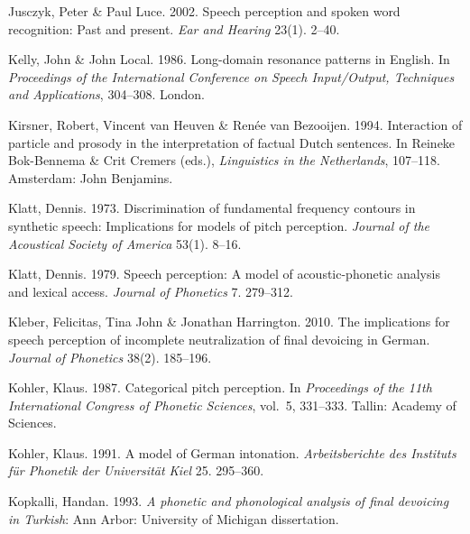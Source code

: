 \documentclass[ number=1
,series=labphon
,output=long
,url=http://langsci-press.org/catalog/book/16
,isbn=978-3-944675-01-5
]{LSP/langsci}
\begin{document}
\begin{thebibliography}{284}
Jusczyk, Peter \& Paul Luce. 2002.
\newblock Speech perception and spoken word recognition: {P}ast and present.
\newblock \emph{Ear and Hearing} 23(1). 2--40.

\enlargethispage{\baselineskip}
Kelly, John \& John Local. 1986.
\newblock Long-domain resonance patterns in {E}nglish.
\newblock In \emph{Proceedings of the {International Conference on Speech
  Input/Output, Techniques and Applications}}, 304--308. London.

Kirsner, Robert, Vincent {van Heuven} \& Renée {van Bezooijen}. 1994.
\newblock Interaction of particle and prosody in the interpretation of factual
  {D}utch sentences.
\newblock In Reineke Bok-Bennema \& Crit Cremers (eds.), \emph{Linguistics in
  the {N}etherlands}, 107--118. Amsterdam: John Benjamins.

Klatt, Dennis. 1973.
\newblock Discrimination of fundamental frequency contours in synthetic speech:
  {I}mplications for models of pitch perception.
\newblock \emph{Journal of the Acoustical Society of America} 53(1). 8--16.

Klatt, Dennis. 1979.
\newblock Speech perception: {A} model of acoustic-phonetic analysis and
  lexical access.
\newblock \emph{Journal of Phonetics} 7. 279--312.

Kleber, Felicitas, Tina John \& Jonathan Harrington. 2010.
\newblock The implications for speech perception of incomplete neutralization
  of final devoicing in {G}erman.
\newblock \emph{Journal of Phonetics} 38(2). 185--196.

Kohler, Klaus. 1987.
\newblock Categorical pitch perception.
\newblock In \emph{Proceedings of the 11th {I}nternational {C}ongress of
  {P}honetic {S}ciences}, vol.~5, 331--333. Tallin: Academy of Sciences.

Kohler, Klaus. 1991.
\newblock A model of {G}erman intonation.
\newblock \emph{Arbeitsberichte des Instituts f\"{u}r Phonetik der
  Universit\"{a}t Kiel} 25. 295--360.

Kopkalli, Handan. 1993.
\newblock \emph{A phonetic and phonological analysis of final devoicing in
  {T}urkish}: Ann Arbor: University of Michigan dissertation.


\end{thebibliography}
\end{document}
